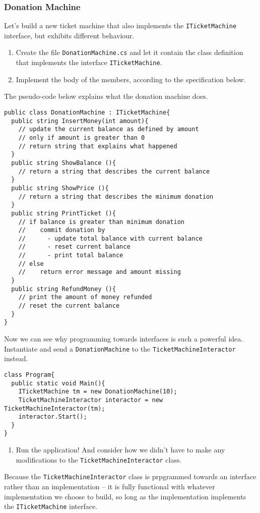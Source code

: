 \documentclass{article}
\newcounter{stepcounter}
\newenvironment{steps}{ 
  \begin{enumerate}[label=\color{red}Step \theenumi)]
    \setcounter{enumi}{\value{stepcounter}}
}{
  \setcounter{stepcounter}{\value{enumi}}
  \end{enumerate}
}
\begin{document}
\subsubsection{Donation Machine}
Let's build a new ticket machine that also implements the \texttt{ITicketMachine} interface, but exhibits different behaviour.
\begin{steps}
\item Create the file \texttt{DonationMachine.cs} and let it contain the class definition that implements the interface \texttt{ITicketMachine}.
\item Implement the body of the members, according to the specification below.
\end{steps}
The pseudo-code below explains what the donation machine does.
\begin{lstlisting}
public class DonationMachine : ITicketMachine{
  public string InsertMoney(int amount){
    // update the current balance as defined by amount
    // only if amount is greater than 0
    // return string that explains what happened
  }
  public string ShowBalance (){
    // return a string that describes the current balance
  }
  public string ShowPrice (){
    // return a string that describes the minimum donation
  }
  public string PrintTicket (){
    // if balance is greater than minimum donation
    //    commit donation by
    //      - update total balance with current balance
    //      - reset current balance
    //      - print total balance
    // else
    //    return error message and amount missing
  }
  public string RefundMoney (){
    // print the amount of money refunded
    // reset the current balance
  }
}
\end{lstlisting}
Now we can see why programming towards interfaces is such a powerful idea. Instantiate and send a \texttt{DonationMachine} to the \texttt{TicketMachineInteractor} instead.
\begin{lstlisting}
class Program{
  public static void Main(){
    ITicketMachine tm = new DonationMachine(10);
    TicketMachineInteractor interactor = new TicketMachineInteractor(tm);
    interactor.Start();
  }
}
\end{lstlisting}
\begin{steps}
\item Run the application! And consider how we didn't have to make any modifications to the \texttt{TicketMachineInteractor} class.
\end{steps}
Because the \texttt{TicketMachineInteractor} class is prpgrammed towards an interface rather than an implementation -- it is fully functional with whatever implementation we choose to build, so long as the implementation implements the \texttt{ITicketMachine} interface.
\end{document}
